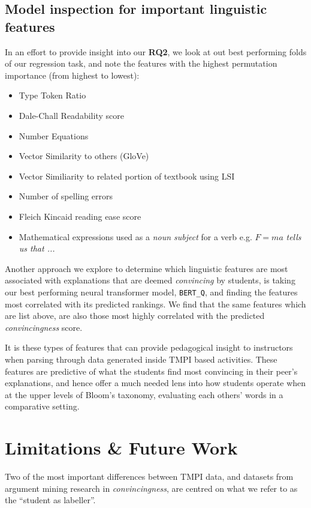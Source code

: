 \documentclass[notitlepage,12pt]{jedm}
\begin{document}
\subsection{Model inspection for important linguistic features}
In an effort to provide insight into our \textbf{RQ2}, we look at out best 
performing folds of our regression task, and note the features with the highest 
permutation importance (from highest to lowest):

\begin{itemize}
	\item Type Token Ratio
	\item Dale-Chall Readability score
	\item Number Equations
	\item Vector Similarity to others (GloVe)
	\item Vector Similiarity to related portion of textbook using LSI
	\item Number of spelling errors
	\item Fleich Kincaid reading ease score
	\item Mathematical expressions used as a \textit{noun subject} for a verb  
	e.g. $F=ma$ \textit{tells us that ...}
\end{itemize}

Another approach we explore to determine which linguistic features are most 
associated with explanations that are deemed \textit{convincing} by students, 
is taking our best performing neural transformer model, \verb|BERT_Q|, and 
finding the features most correlated with its predicted rankings. 
We find that the same features which are list above, are also those most highly 
correlated with the predicted \textit{convincingness} score.

It is these types of features that can provide pedagogical insight to 
instructors when parsing through data generated inside TMPI based activities.
These features are predictive of what the students find most convincing in 
their peer's explanations, and hence offer a much needed lens into how students 
operate when at the upper levels of Bloom's taxonomy, evaluating each others' 
words in a comparative setting.

\section{Limitations \& Future Work}

Two of the most important differences between TMPI data, and datasets from 
argument mining research in \textit{convincingness}, are centred on what we 
refer to as the ``student as labeller''. 
\end{document}
